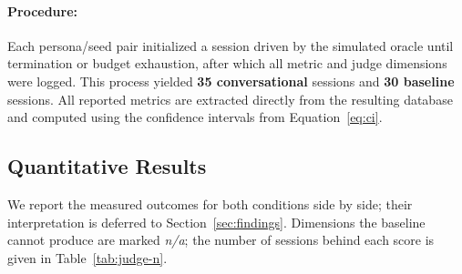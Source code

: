 \paragraph{Procedure:} Each persona/seed pair initialized a session driven by the simulated oracle until termination or budget exhaustion, after which all metric and judge dimensions were logged.
This process yielded \textbf{35 conversational} sessions and \textbf{30 baseline} sessions.
All reported metrics are extracted directly from the resulting database and computed using the confidence intervals from Equation~\ref{eq:ci}.

\subsection{Quantitative Results}

We report the measured outcomes for both conditions side by side; their interpretation is deferred to Section~\ref{sec:findings}.	
Dimensions the baseline cannot produce are marked \textit{n/a}; the number of sessions behind each
score is given in Table~\ref{tab:judge-n}.

\begin{table}[H]
  \centering
  \caption{Sessions contributing to each score. The four always-on dimensions (operation
  appropriateness, intent alignment, label accuracy, clustering coherence) share the same counts.}
  \label{tab:judge-n}
\end{table}

